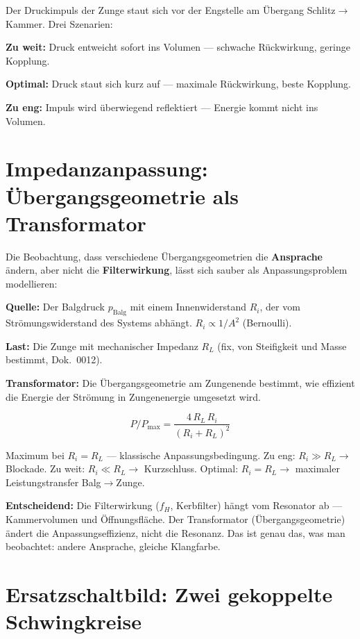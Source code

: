 \documentclass[11pt,a4paper]{article}
\begin{document}
Der Druckimpuls der Zunge staut sich vor der Engstelle am Übergang
Schlitz$\to$Kammer. Drei Szenarien:

\textbf{Zu weit:} Druck entweicht sofort ins Volumen --- schwache Rückwirkung,
geringe Kopplung.

\textbf{Optimal:} Druck staut sich kurz auf --- maximale Rückwirkung,
beste Kopplung.

\textbf{Zu eng:} Impuls wird überwiegend reflektiert --- Energie kommt
nicht ins Volumen.

\section{Impedanzanpassung: Übergangsgeometrie als Transformator}

Die Beobachtung, dass verschiedene Übergangsgeometrien die \textbf{Ansprache}
ändern, aber nicht die \textbf{Filterwirkung}, lässt sich sauber als
Anpassungsproblem modellieren:

\textbf{Quelle:} Der Balgdruck $p_\mathrm{Balg}$ mit einem Innenwiderstand $R_i$,
der vom Strömungswiderstand des Systems abhängt. $R_i \propto 1/A^2$ (Bernoulli).

\textbf{Last:} Die Zunge mit mechanischer Impedanz $R_L$ (fix, von Steifigkeit
und Masse bestimmt, Dok.~0012).

\textbf{Transformator:} Die Übergangsgeometrie am Zungenende bestimmt,
wie effizient die Energie der Strömung in Zungenenergie umgesetzt wird.

\begin{equation}
P / P_\mathrm{max} = \frac{4 \, R_L \, R_i}{(R_i + R_L)^2}
\end{equation}

Maximum bei $R_i = R_L$ --- klassische Anpassungsbedingung.
Zu eng: $R_i \gg R_L \to$ Blockade. Zu weit: $R_i \ll R_L \to$ Kurzschluss.
Optimal: $R_i = R_L \to$ maximaler Leistungstransfer Balg$\to$Zunge.

\begin{tcolorbox}[colframe=keygreen, colback=green!5!white]
\textbf{Entscheidend:} Die Filterwirkung ($f_H$, Kerbfilter) hängt vom
Resonator ab --- Kammervolumen und Öffnungsfläche. Der Transformator
(Übergangsgeometrie) ändert die Anpassungseffizienz, nicht die Resonanz.
Das ist genau das, was man beobachtet: andere Ansprache, gleiche Klangfarbe.
\end{tcolorbox}

\section{Ersatzschaltbild: Zwei gekoppelte Schwingkreise}
\end{document}
